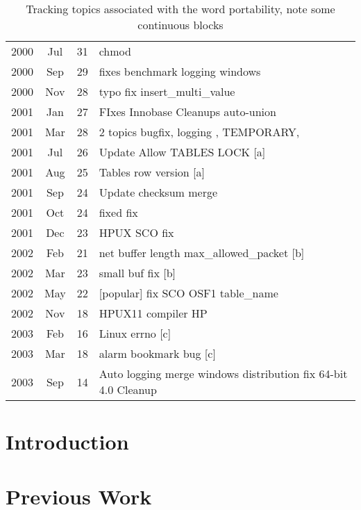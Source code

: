 \documentclass{report}
\begin{document}
\begin{table}
\centering
\begin{tabular}{|ccc|l|}
\hline
2000 &  Jul &  31 &    chmod \\
2000 &  Sep &  29 &    fixes benchmark logging windows \\
2000 &  Nov &  28 &    typo fix insert\_multi\_value \\
2001 &  Jan &  27 &    FIxes Innobase Cleanups auto-union \\
2001 &  Mar &  28 &    2 topics bugfix, logging , TEMPORARY,  \\
\hline
2001 &  Jul &  26 &    Update Allow TABLES LOCK [a] \\ 

2001 &  Aug &  25 &    Tables row version [a] \\
\hline
2001 &  Sep &  24 &    Update checksum merge \\
2001 &  Oct &  24 &    fixed fix \\
2001 &  Dec &  23 &    HPUX SCO fix \\
\hline
2002 &  Feb &  21 &    net buffer length  max\_allowed\_packet [b] \\
2002 &  Mar &  23 &    small buf fix [b]  \\
\hline
2002 &  May &  22 &    [popular] fix SCO OSF1 table\_name \\
2002 &  Nov &  18 &    HPUX11 compiler HP \\
\hline
2003 &  Feb &  16 &    Linux errno  [c] \\
2003 &  Mar &  18 &    alarm bookmark bug [c] \\
\hline
2003 &  Sep &  14 &    Auto logging merge windows distribution fix 64-bit 4.0 Cleanup \\
\hline
\end{tabular}
\caption{Tracking topics associated with the word portability, note some continuous blocks}
\label{tab:portability}
\end{table}

\begin{abstract}
\end{abstract}
\section{Introduction}

\section{Previous Work}
\end{document}
